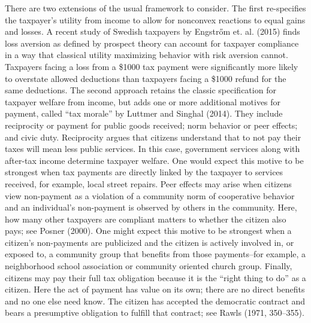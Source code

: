 \documentclass[12pt,titlepage]{article}
\begin{document}
There are two extensions of the usual framework to consider. 
The first re-specifies the taxpayer’s utility from income to allow for
nonconvex reactions to equal gains and losses.  A recent study of 
Swedish taxpayers by Engstr{\H o}m et. al. (2015) finds loss aversion 
as defined by prospect theory can account for taxpayer compliance in 
a way that classical utility maximizing behavior with risk aversion 
cannot.  Taxpayers facing a loss from a \$1000 tax payment were
significantly more likely to overstate allowed deductions than
taxpayers facing a \$1000 refund for the same deductions.  
The second approach retains the classic specification for 
taxpayer welfare from income, but adds one or more additional 
motives for payment, called “tax morale” by Luttmer and Singhal (2014).  
They include reciprocity or payment for public goods received; 
norm behavior or peer effects; and civic duty.   Reciprocity argues 
that citizens understand that to not pay their taxes will mean less 
public services.   In this case, government services along with 
after-tax income determine taxpayer welfare.  One would expect this 
motive to be strongest when tax payments are directly linked by the 
taxpayer to services received, for example, local street repairs.   
Peer effects may arise when citizens view non-payment as a violation 
of a community norm of cooperative behavior and an individual’s 
non-payment is observed by others in the community.  Here, how many 
other taxpayers are compliant matters to whether the citizen 
also pays; see Posner (2000).   One might expect this motive to be 
strongest when a citizen’s non-payments are publicized and the citizen 
is actively involved in, or exposed to,  a community group that benefits 
from those payments--for example, a neighborhood school association or 
community oriented church group.  Finally, citizens may pay their full 
tax obligation because it is the “right thing to do” as a citizen.  
Here the act of payment has value on its own; there are no direct 
benefits and no one else need know.  The citizen has accepted the 
democratic contract and bears a presumptive obligation to fulfill 
that contract; see Rawls (1971, 350–355).  
\end{document}
